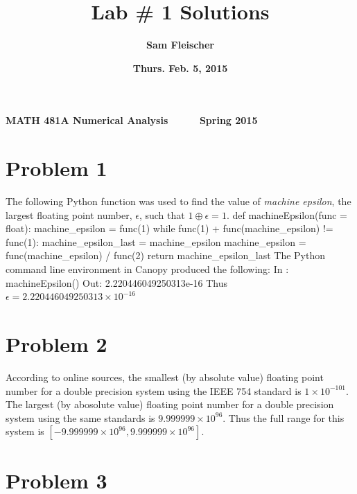\documentclass[12pt]{article}
\newenvironment{qv}
{\quote\Verbatim}
{\endVerbatim\endquote}
\begin{document}
{\bf MATH 481A \hfill Numerical Analysis \ \ \ \ \ \hfill Spring 2015}

\title{\bf Lab \# 1 Solutions}
\author{\bf Sam Fleischer}
\date{\bf Thurs. Feb. 5, 2015}

{\let\newpage\relax\maketitle}
\maketitle
\tableofcontents
\pagebreak

\section*{Problem 1}

The following Python function was used to find the value of {\it machine epsilon}, the largest floating point number, $\epsilon$, such that $1 \oplus \epsilon = 1$.
\begin{qv}
def machineEpsilon(func = float):
    machine_epsilon = func(1)
    while func(1) + func(machine_epsilon) != func(1):
        machine_epsilon_last = machine_epsilon
        machine_epsilon = func(machine_epsilon) / func(2)
    return machine_epsilon_last
\end{qv}
The Python command line environment in Canopy produced the following:
\begin{qv}
In : machineEpsilon()
Out: 2.220446049250313e-16
\end{qv}
Thus $\boxed{\epsilon = 2.220446049250313 \times 10^{-16}}$

\section*{Problem 2}

According to online sources, the smallest (by absolute value) floating point number for a double precision system using the IEEE 754 standard is $1 \times 10^{-101}$.  The largest (by abosolute value) floating point number for a double precision system using the same standards is $9.999999 \times 10^{96}$.  Thus the full range for this system is $[-9.999999 \times 10^{96}, 9.999999 \times 10^{96}]$.

\section*{Problem 3}
\end{document}

